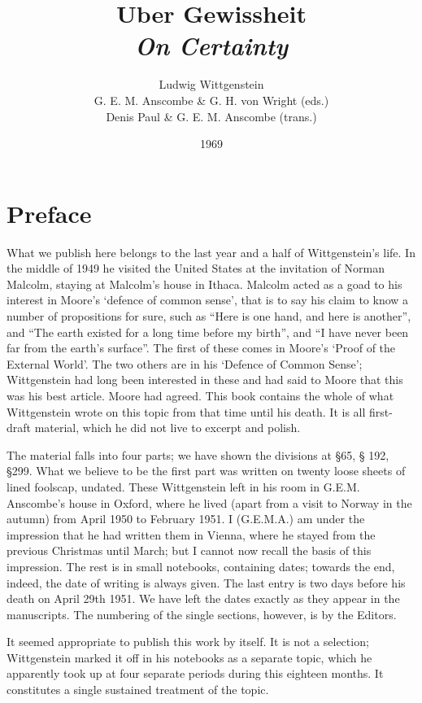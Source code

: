 \documentclass{book}
\title{Uber Gewissheit \\
       \emph{On Certainty}}
\author{Ludwig Wittgenstein \vspace{12pt} \\
	    G. E. M. Anscombe \& G. H. von Wright (eds.) \\
        Denis Paul \& G. E. M. Anscombe (trans.)}
\date{1969}
\begin{document}
\frontmatter
\maketitle

\chapter{Preface}

What we publish here belongs to the last year and a half of Wittgenstein's
life. In the middle of 1949 he visited the United States at the invitation of
Norman Malcolm, staying at Malcolm's house in Ithaca. Malcolm acted as a goad
to his interest in Moore's `defence of common sense', that is to say his claim
to know a number of propositions for sure, such as ``Here is one hand, and here
is another'', and ``The earth existed for a long time before my birth'', and
``I have never been far from the earth's surface''. The first of these comes in
Moore's `Proof of the External World'. The two others are in his `Defence of
Common Sense'; Wittgenstein had long been interested in these and had said to
Moore that this was his best article. Moore had agreed. This book contains the
whole of what Wittgenstein wrote on this topic from that time until his death.
It is all first-draft material, which he did not live to excerpt and polish.

The material falls into four parts; we have shown the divisions at \S 65, \S
192, \S 299. What we believe to be the first part was written on twenty loose
sheets of lined foolscap, undated. These Wittgenstein left in his room in
G.E.M. Anscombe's house in Oxford, where he lived (apart from a visit to Norway
in the autumn) from April 1950 to February 1951. I (G.E.M.A.) am under the
impression that he had written them in Vienna, where he stayed from the
previous Christmas until March; but I cannot now recall the basis of this
impression. The rest is in small notebooks, containing dates; towards the end,
indeed, the date of writing is always given. The last entry is two days before
his death on April 29th 1951. We have left the dates exactly as they appear in
the manuscripts. The numbering of the single sections, however, is by the
Editors.

It seemed appropriate to publish this work by itself. It is not a selection;
Wittgenstein marked it off in his notebooks as a separate topic, which he
apparently took up at four separate periods during this eighteen months. It
constitutes a single sustained treatment of the topic.
\end{document}
